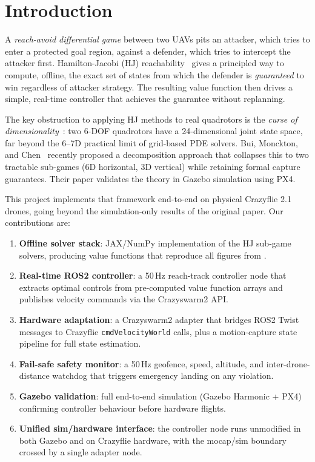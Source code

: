 \documentclass[conference]{IEEEtran}
\begin{document}
\section{Introduction}
\label{sec:intro}

A \emph{reach-avoid differential game} between two UAVs pits an attacker, which tries to enter a protected goal region, against a defender, which tries to intercept the attacker first. Hamilton-Jacobi (HJ) reachability~\cite{mitchell2005time,bansal2017hamilton} gives a principled way to compute, offline, the exact set of states from which the defender is \emph{guaranteed} to win regardless of attacker strategy. The resulting value function then drives a simple, real-time controller that achieves the guarantee without replanning.

The key obstruction to applying HJ methods to real quadrotors is the \emph{curse of dimensionality}~\cite{bellman1957dynamic}: two 6-DOF quadrotors have a 24-dimensional joint state space, far beyond the 6--7D practical limit of grid-based PDE solvers. Bui, Monckton, and Chen~\cite{bui2025reach} recently proposed a decomposition approach that collapses this to two tractable sub-games (6D horizontal, 3D vertical) while retaining formal capture guarantees. Their paper validates the theory in Gazebo simulation using PX4.

This project implements that framework end-to-end on physical Crazyflie 2.1 drones, going beyond the simulation-only results of the original paper. Our contributions are:

\begin{enumerate}
  \item \textbf{Offline solver stack}: JAX/NumPy implementation of the HJ sub-game solvers, producing value functions that reproduce all figures from \cite{bui2025reach}.
  \item \textbf{Real-time ROS2 controller}: a 50\,Hz reach-track controller node that extracts optimal controls from pre-computed value function arrays and publishes velocity commands via the Crazyswarm2 API.
  \item \textbf{Hardware adaptation}: a Crazyswarm2 adapter that bridges ROS2 Twist messages to Crazyflie \texttt{cmdVelocityWorld} calls, plus a motion-capture state pipeline for full state estimation.
  \item \textbf{Fail-safe safety monitor}: a 50\,Hz geofence, speed, altitude, and inter-drone-distance watchdog that triggers emergency landing on any violation.
  \item \textbf{Gazebo validation}: full end-to-end simulation (Gazebo Harmonic + PX4) confirming controller behaviour before hardware flights.
  \item \textbf{Unified sim/hardware interface}: the controller node runs unmodified in both Gazebo and on Crazyflie hardware, with the mocap/sim boundary crossed by a single adapter node.
\end{enumerate}
\end{document}
